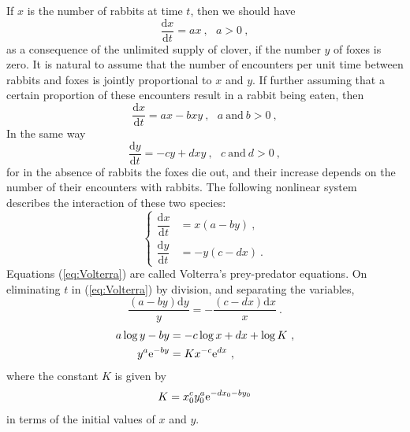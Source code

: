 \documentclass[11pt,a4paper]{article}
\newcommand{\dif}{\mathrm{d}}
\begin{document}
If $x$ is the number of rabbits at time $t$, then we should have
\begin{equation}
\dfrac{\dif x}{\dif t} = a x ~,  ~~~ a > 0 ~,
\end{equation}
as a consequence of the unlimited supply of clover, if the number $y$ of foxes is zero. It is natural to assume that the number of encounters per unit time between rabbits and foxes is jointly proportional to $x$ and $y$. If further assuming that a certain proportion of these encounters result in a rabbit being eaten, then 
\begin{equation}
\dfrac{\dif x}{\dif t} = a x - b xy ~,  ~~~ a~ \text{and}~ b > 0 ~,
\end{equation}
In the same way
\begin{equation}
\dfrac{\dif y}{\dif t} = - cy + d xy ~,  ~~~ c~ \text{and}~ d > 0 ~,
\end{equation}
for in the absence of rabbits the foxes die out, and their increase depends on the number of their encounters with rabbits. The following nonlinear system describes the interaction of these two species:
\begin{equation}
\left\{
\begin{aligned}
\dfrac{\dif x}{\dif t} &= x(a  - b y) ~, \\
\dfrac{\dif y}{\dif t} &= - y(c - d x) ~. 
\end{aligned}
\right.
\label{eq:Volterra}
\end{equation}
Equations (\ref{eq:Volterra}) are called Volterra's prey-predator equations. On eliminating $t$ in (\ref{eq:Volterra}) by division, and separating the variables,
\begin{equation}
\dfrac{(a-by)\dif y}{y} = -\dfrac{(c-dx)\dif x}{x} ~.
\end{equation}
\begin{align}
\nonumber  a \log y - by &= -c \log x +d x + \log K ~, \\
y^a {\rm e}^{-by} &= K x^{-c} {\rm e}^{dx} ~,
\label{eq:Volterra_sol}
\end{align}
where the constant $K$ is given by
\begin{equation}
K = x_0^{c} y_0^a {\rm e}^{-dx_0 -by_0}
\end{equation}
in terms of the initial values of $x$ and $y$.
\end{document}
